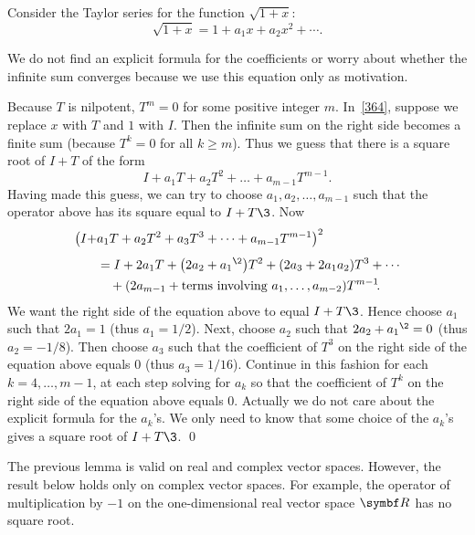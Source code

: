 
\proof
Consider the Taylor series for the function $\sqrt{1 +
x}$:
\begin{equation} \label{364}
\sqrt{1 + x} = 1 + a_1 x + a_2 x^2 + \dotsb .
\end{equation}%


We do not find an explicit formula for the coefficients or worry about whether the infinite sum converges because we use this equation only as \mbox{motivation}.

Because $T$ is nilpotent, $T^m = 0$ for some positive integer $m$.  In~\ref{364},
suppose we replace $x$ with $T$ and $1$ with $I$.  Then the infinite sum on the right
side becomes a finite sum (because $T^k = 0$ for all $k \ge m$).  Thus we
guess that there is a square root of $I + T$ of the form
\[
I + a_1 T + a_2 T^2 + \dots + a_{m-1} T^{m-1}\!.
\]
Having made this guess, we can try to choose $a_1, a_2, \dots, a_{m-1}$ such that
the operator above has its square equal to $I + T\3$.  Now
\begin{align*}
\paren[\big]{I + &a_1 T + a_2 T^2 + a_3 T^3 + \dots + a_{m-1} T^{m-1}}^2 \\[4bp]
&= I + 2a_1 T + \paren[\big]{2a_2 + {a_1}^{\2}} T^2 + (2a_3 + 2 a_1 a_2) T^3 + \dotsb \\
&\quad {} + (2a_{m-1} + \text{terms involving $a_1, \dots, a_{m-2}$}) T^{m-1}\!.
\end{align*}
We want the right side of the equation above to equal $I + T\3$.  Hence
choose $a_1$ such that $2a_1 = 1$ (thus $a_1 = 1/2$).  Next, choose $a_2$ such
that $2a_2 + {a_1}^{\2} = 0$ (thus $a_2 = -1/8$).  Then choose $a_3$ such that the
coefficient of $T^3$ on the right side of the equation above equals $0$ (thus
$a_3 = 1/16$).  Continue in this fashion for each $k = 4, \dots, m-1$, at each step solving
for $a_k$ so that the coefficient of $T^k$ on the right side of the equation above
equals $0$.  Actually we do not care about the explicit formula for the $a_k$'s.  We
only need to know that some choice of the $a_k$'s gives a square root of $I + T\3$.
\qed

The previous lemma is valid on real and complex vector spaces.
However, the result below holds only on complex vector spaces. For example, the
operator of multiplication by $-1$ on the one-dimensional real vector space $\R{}$ has no square root.

